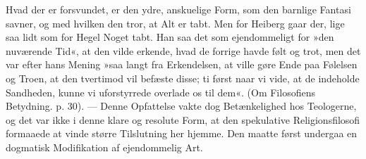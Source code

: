 \documentclass[12pt,a4paper,openany]{book}
\begin{document}
Hvad der er forsvundet, er den ydre, anskuelige
Form, som den barnlige Fantasi savner, og med hvilken
den tror, at Alt er tabt. Men for Heiberg gaar der, lige
saa lidt som for Hegel Noget tabt. Han saa det som
ejendommeligt for »den nuværende Tid«, at den vilde
erkende, hvad de forrige havde følt og trot, men det var
efter hans Mening »saa langt fra Erkendelsen, at ville
gøre Ende paa Følelsen og Troen, at den tvertimod vil
befæste disse; ti først naar vi vide, at de indeholde
Sandheden, kunne vi uforstyrrede overlade os til dem«.
(Om Filosofiens Betydning. p. 30). --- Denne Opfattelse
vakte dog Betænkelighed hos Teologerne, og det var
ikke i denne klare og resolute Form, at den spekulative
Religionsfilosofi formaaede at vinde større Tilslutning her
hjemme. Den maatte først undergaa en dogmatisk Modifikation
af ejendommelig Art.
\end{document}
